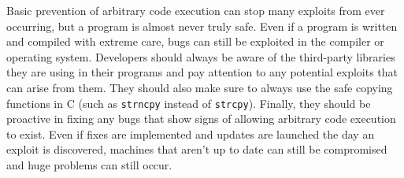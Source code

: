Basic prevention of arbitrary code execution can stop many exploits from ever occurring, but a program is almost never truly safe. Even if a program is written and compiled with extreme care, bugs can still be exploited in the compiler or operating system. Developers should always be aware of the third-party libraries they are using in their programs and pay attention to any potential exploits that can arise from them. They should also make sure to always use the safe copying functions in C (such as \texttt{strncpy} instead of \texttt{strcpy}). Finally, they should be proactive in fixing any bugs that show signs of allowing arbitrary code execution to exist. Even if fixes are implemented and updates are launched the day an exploit is discovered, machines that aren’t up to date can still be compromised and huge problems can still occur.
